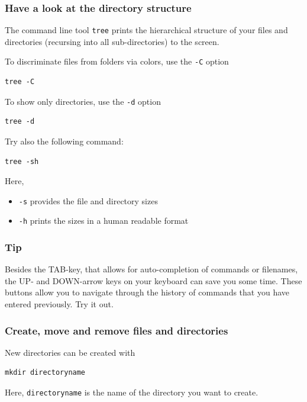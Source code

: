 \documentclass[11pt]{article}
\begin{document}
\subsubsection{Have a look at the directory structure}
\label{sec:orgheadline6}
The command line tool \texttt{tree} prints the hierarchical structure of your
files and directories (recursing into all sub-directories) to the screen.

To discriminate files from folders via colors, use the \texttt{-C} option

\begin{verbatim}
tree -C
\end{verbatim}

To show only directories, use the \texttt{-d} option

\begin{verbatim}
tree -d
\end{verbatim}



Try also the following command:

\begin{verbatim}
tree -sh
\end{verbatim}

Here, 
\begin{itemize}
\item \texttt{-s} provides the file and directory sizes
\item \texttt{-h} prints the sizes in a human readable format
\end{itemize}

\subsubsection{Tip}
\label{sec:orgheadline7}
Besides the TAB-key, that allows for auto-completion of commands or
filenames, the UP- and DOWN-arrow keys on your keyboard can save you
some time. These buttons allow you to navigate through the history of
commands that you have entered previously.  Try it out.

\subsubsection{Create, move and remove files and directories}
\label{sec:orgheadline8}
New directories can be created with

\begin{verbatim}
mkdir directoryname
\end{verbatim}
Here, \texttt{directoryname} is the name of the directory you want to create.
\end{document}

